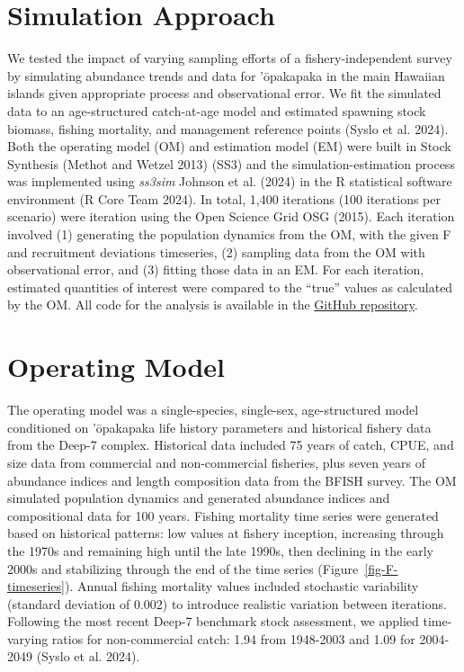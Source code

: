 \documentclass[
  letterpaper,
  12pt,
  letterpaper]{report}
\begin{document}
\section{Simulation Approach}\label{simulation-approach}

We tested the impact of varying sampling efforts of a
fishery-independent survey by simulating abundance trends and data for
'ōpakapaka in the main Hawaiian islands given appropriate process and
observational error. We fit the simulated data to an age-structured
catch-at-age model and estimated spawning stock biomass, fishing
mortality, and management reference points (Syslo et al. 2024). Both the
operating model (OM) and estimation model (EM) were built in Stock
Synthesis (Methot and Wetzel 2013) (SS3) and the simulation-estimation
process was implemented using \emph{ss3sim} Johnson et al. (2024) in the
R statistical software environment (R Core Team 2024). In total, 1,400
iterations (100 iterations per scenario) were iteration using the Open
Science Grid OSG (2015). Each iteration involved (1) generating the
population dynamics from the OM, with the given F and recruitment
deviations timeseries, (2) sampling data from the OM with observational
error, and (3) fitting those data in an EM. For each iteration,
estimated quantities of interest were compared to the ``true'' values as
calculated by the OM. All code for the analysis is available in the
\href{https://github.com/noaa-pifsc/Opaka_simulation}{GitHub
repository}.

\section{Operating Model}\label{operating-model}

The operating model was a single-species, single-sex, age-structured
model conditioned on 'ōpakapaka life history parameters and historical
fishery data from the Deep-7 complex. Historical data included 75 years
of catch, CPUE, and size data from commercial and non-commercial
fisheries, plus seven years of abundance indices and length composition
data from the BFISH survey. The OM simulated population dynamics and
generated abundance indices and compositional data for 100 years.
Fishing mortality time series were generated based on historical
patterns: low values at fishery inception, increasing through the 1970s
and remaining high until the late 1990s, then declining in the early
2000s and stabilizing through the end of the time series
(Figure~\ref{fig-F-timeseries}). Annual fishing mortality values
included stochastic variability (standard deviation of 0.002) to
introduce realistic variation between iterations. Following the most
recent Deep-7 benchmark stock assessment, we applied time-varying ratios
for non-commercial catch: 1.94 from 1948-2003 and 1.09 for 2004-2049
(Syslo et al. 2024).
\end{document}
